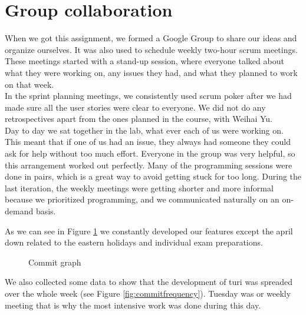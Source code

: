 \documentclass[a4paper]{article}
\begin{document}
\section{Group collaboration}
When we got this assignment, we formed a Google Group to share our ideas and organize ourselves. It was also used to schedule weekly two-hour scrum meetings. These meetings started with a stand-up session, where everyone talked about what they were working on, any issues they had, and what they planned to work on that week.\\

\noindent
In the sprint planning meetings, we consistently used scrum poker after we had made sure all the user stories were clear to everyone. We did not do any retrospectives apart from the ones planned in the course, with Weihai Yu.\\

\noindent
Day to day we sat together in the lab, what ever each of us were working on. This meant that if one of us had an issue, they always had someone they could ask for help without too much effort. Everyone in the group was very helpful, so this arrangement worked out perfectly. Many of the programming sessions were done in pairs, which is a great way to avoid getting stuck for too long. During the last iteration, the weekly meetings were getting shorter and more informal because we prioritized programming, and we communicated naturally on an on-demand basis.


\noindent
As we can see in Figure \ref{fig:commitgraph} we constantly developed our features except the april down related to the eastern holidays and individual exam preparations.\\

\begin{figure}[!h]
  \begin{center}
    \caption{Commit graph}
    \label{fig:commitgraph}
  \end{center}
\end{figure}

We also collected some data to show that the development of turi was spreaded over the whole week (see Figure \ref{fig:commitfrequency}). Tuesday was or weekly meeting that is why the most intensive work was done during this day. \\
\end{document}
